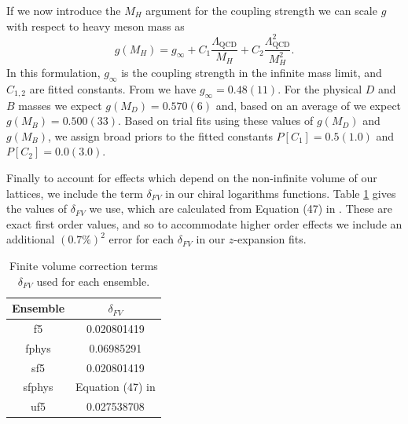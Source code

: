 If we now introduce the $M_H$ argument for the coupling strength we can scale $g$ with respect to heavy meson mass as
\begin{equation}\label{eq:g_coupling}
    g(M_H) = g_\infty + C_1\frac{\Lambda_\mathrm{QCD}}{M_H} + C_2\frac{\Lambda^2_\mathrm{QCD}}{M_H^2}.
\end{equation}
In this formulation, $g_\infty$ is the coupling strength in the infinite mass limit, and $C_{1,2}$ are fitted constants.  From \cite{Asmaa_Abada_2004} we have $g_\infty = 0.48(11)$. For the physical $D$ and $B$ masses we expect $g(M_D) = 0.570(6)$ \cite{PhysRevD.88.052003} and, based on an average of \cite{PhysRevD.93.014510,PhysRevLett.108.172003,2015278} we expect $g(M_B)=0.500(33)$.  Based on trial fits using these values of $g(M_D)$ and $g(M_B)$, we assign broad priors to the fitted constants $P[C_1]=0.5(1.0)$ and $P[C_2]=0.0(3.0)$. 

Finally to account for effects which depend on the non-infinite volume of our lattices, we include the term $\delta_{FV}$ in our chiral logarithms functions.  Table \ref{tab:delta_FV} gives the values of $\delta_{FV}$ we use, which are calculated from Equation (47) in \cite{PhysRevD.65.054031}.  These are exact first order values, and so to accommodate higher order effects we include an additional $(0.7\%)^2$ error for each $\delta_{FV}$ in our $z$-expansion fits.
\begin{table}[]
    \centering
    \caption{Finite volume correction terms $\delta_{FV}$ used for each ensemble.}
    \begin{tabular}{c c}
    \hline
    Ensemble & $\delta_{FV}$ \\
    \hline
    f5     & 0.020801419 \\
    fphys  & 0.06985291 \\
    sf5    & 0.020801419 \\
    sfphys & Equation (47) in \cite{PhysRevD.65.054031} \\
    uf5    & 0.027538708 \\
    \hline
    \end{tabular}
    \label{tab:delta_FV}
\end{table}

